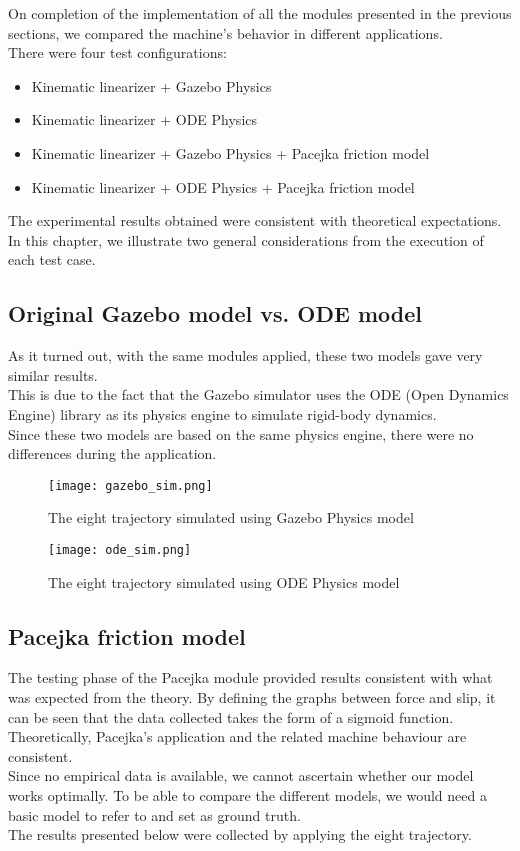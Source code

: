 On completion of the implementation of all the modules presented in the previous sections, we compared the machine's behavior in different applications.\\
There were four test configurations:
\begin{itemize}
	\item Kinematic linearizer + Gazebo Physics
	\item Kinematic linearizer + ODE Physics
	\item Kinematic linearizer + Gazebo Physics + Pacejka friction model 
	\item Kinematic linearizer + ODE Physics + Pacejka friction model
\end{itemize}
The experimental results obtained were consistent with theoretical expectations. \\
In this chapter, we illustrate two general considerations from the execution of each test case.

\subsection{Original Gazebo model vs. ODE model}
As it turned out, with the same modules applied, these two models gave very similar results.\\
This is due to the fact that the Gazebo simulator uses the ODE (Open Dynamics Engine) library as its physics engine to simulate rigid-body dynamics.\\
Since these two models are based on the same physics engine, there were no differences during the application.

\begin{figure}[H]
	\texttt{[image: gazebo\_sim.png]}
	\caption{The eight trajectory simulated using Gazebo Physics model}
\end{figure}

\begin{figure}[H]
	\texttt{[image: ode\_sim.png]}
	\caption{The eight trajectory simulated using ODE Physics model}
\end{figure}


\subsection{Pacejka friction model}
The testing phase of the Pacejka module provided results consistent with what was expected from the theory. By defining the graphs between force and slip, it can be seen that the data collected takes the form of a sigmoid function.\\
Theoretically, Pacejka's application and the related machine behaviour are consistent. \\
Since no empirical data is available, we cannot ascertain whether our model works optimally. To be able to compare the different models, we would need a basic model to refer to and set as ground truth.\\
The results presented below were collected by applying the eight trajectory.

